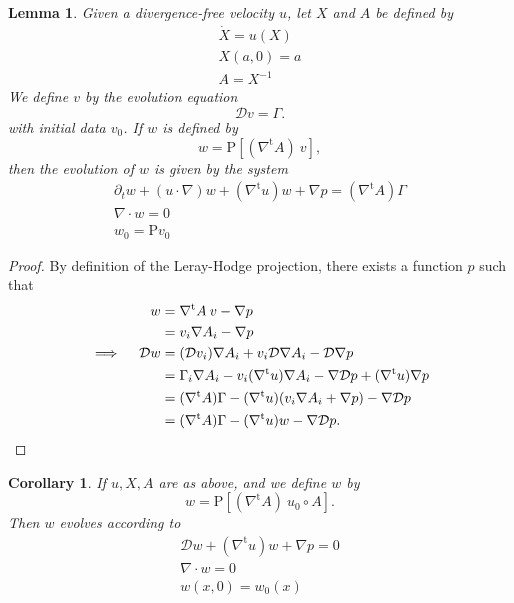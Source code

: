 \documentclass[final]{amsart}%
\newcommand{\del}{\partial}
\newcommand{\inv}{^{-1}}
\newcommand{\transpose}{^\text{t}}
\newcommand{\grad}{\nabla}
\newcommand{\gradt}{\grad\transpose}
\newcommand{\divergence}{\grad \cdot}
\newcommand{\lhp}{\boldsymbol{\mathrm{P}}}
\newcommand{\Dop}{\mathcal{D}}
\numberwithin{equation}{section}
\newtheorem{lemma}[theorem]{Lemma}
\newtheorem{cor}[theorem]{Corollary}
\theoremstyle{definition}
\theoremstyle{remark}
\begin{document}
\begin{lemma}\label{l:w-evol}%
Given a divergence-free velocity $u$, let $X$ and $A$ be defined by
\begin{gather*}
\dot{X} = u(X)\\
X(a,0) = a\\
A = X\inv
\end{gather*}
We define $v$ by the evolution equation
\begin{equation*}
\Dop v = \Gamma.
\end{equation*}
with initial data $v_0$. If $w$ is defined by
\begin{equation*}
w = \lhp\left[ \left(\gradt A\right) \: v\right],
\end{equation*}
then the evolution of $w$ is given by the system
\begin{gather*}
\del_t w + (u \cdot \grad) w + (\gradt u) w + \grad p = (\gradt A) \Gamma\\
\divergence w = 0\\
w_0 = \lhp v_0
\end{gather*}
\end{lemma}

\begin{proof}%
By definition of the Leray-Hodge projection, there exists a function $p$ such that
\begin{align*}
w &= \gradt A \: v - \grad p\\
&= v_i \grad A_i - \grad p\\
\implies\quad \Dop w &= (\Dop v_i) \grad A_i + v_i \Dop \grad A_i - \Dop \grad p\\
&= \Gamma_i \grad A_i - v_i (\gradt u) \grad A_i - \grad \Dop p + (\gradt u) \grad p\\
&= (\gradt A) \Gamma - (\gradt u)( v_i \grad A_i + \grad p) - \grad \Dop p\\
&= (\gradt A) \Gamma - (\gradt u)w - \grad \Dop p. \qedhere
\end{align*}
\end{proof}

\begin{cor}%
If $u, X, A$ are as above, and we define $w$ by
\begin{equation*}
w = \lhp\left[ (\gradt A) \: u_0 \circ A \right].
\end{equation*}
Then $w$ evolves according to
\begin{gather*}
\Dop w + (\gradt u) w + \grad p = 0\\
\divergence w = 0\\
w(x,0) = w_0(x)
\end{gather*}
\end{cor}
\end{document}
